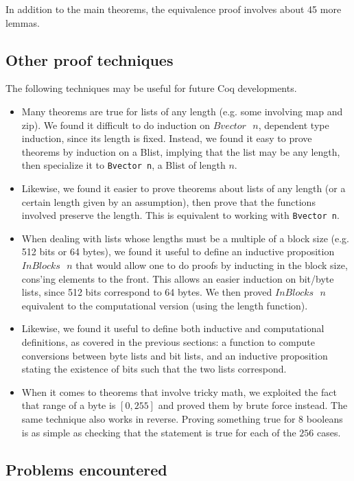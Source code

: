 \documentclass[twocolumn,showpacs,%
  nofootinbib,aps,superscriptaddress,%
  eqsecnum,prd,notitlepage,showkeys,10pt]{revtex4-1}
\newcommand{\s} {\textrm{ }}
\begin{document}
In addition to the main theorems, the equivalence proof involves about 45 more lemmas.

\subsection{Other proof techniques}

The following techniques may be useful for future Coq developments.

\begin{itemize}
\item Many theorems are true for lists of any length (e.g. some involving map and zip). We found it difficult to do induction on $Bvector \s n$, dependent type induction, since its length is fixed. Instead, we found it easy to prove theorems by induction on a Blist, implying that the list may be any length, then specialize it to \verb|Bvector n|, a Blist of length $n$. 
\item Likewise, we found it easier to prove theorems about lists of any length (or a certain length given by an assumption), then prove that the functions involved preserve the length. This is equivalent to working with \verb|Bvector n|. %
\item When dealing with lists whose lengths must be a multiple of a block size (e.g. 512 bits or 64 bytes), we found it useful to define an inductive proposition $InBlocks \s n$ that would allow one to do proofs by inducting in the block size, cons'ing elements to the front. This allows an easier induction on bit/byte lists, since 512 bits correspond to 64 bytes. We then proved $InBlocks \s n$ equivalent to the computational version (using the length function). %
\item Likewise, we found it useful to define both inductive and computational definitions, as covered in the previous sections: a function to compute conversions between byte lists and bit lists, and an inductive proposition stating the existence of bits such that the two lists correspond.
\item When it comes to theorems that involve tricky math, we exploited the fact that range of a byte is $[0, 255]$ and proved them by brute force instead. The same technique also works in reverse. Proving something true for $8$ booleans is as simple as checking that the statement is true for each of the $256$ cases. %
\end{itemize}

\subsection{Problems encountered}
\end{document}
